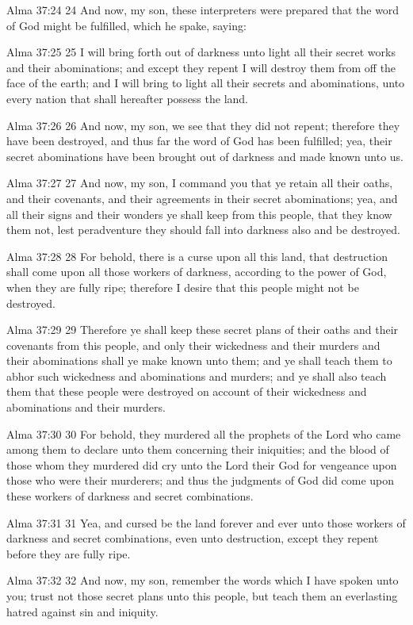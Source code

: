 Alma 37:24
 24 And now, my son, these interpreters were prepared that the
word of God might be fulfilled, which he spake, saying:

Alma 37:25
 25 I will bring forth out of darkness unto light all their
secret works and their abominations; and except they repent I
will destroy them from off the face of the earth; and I will
bring to light all their secrets and abominations, unto every
nation that shall hereafter possess the land.

Alma 37:26
 26 And now, my son, we see that they did not repent; therefore
they have been destroyed, and thus far the word of God has been
fulfilled; yea, their secret abominations have been brought out
of darkness and made known unto us.

Alma 37:27
 27 And now, my son, I command you that ye retain all their
oaths, and their covenants, and their agreements in their secret
abominations; yea, and all their signs and their wonders ye shall
keep from this people, that they know them not, lest peradventure
they should fall into darkness also and be destroyed.

Alma 37:28
 28 For behold, there is a curse upon all this land, that
destruction shall come upon all those workers of darkness,
according to the power of God, when they are fully ripe;
therefore I desire that this people might not be destroyed.

Alma 37:29
 29 Therefore ye shall keep these secret plans of their oaths and
their covenants from this people, and only their wickedness and
their murders and their abominations shall ye make known unto
them; and ye shall teach them to abhor such wickedness and
abominations and murders; and ye shall also teach them that these
people were destroyed on account of their wickedness and
abominations and their murders.

Alma 37:30
 30 For behold, they murdered all the prophets of the Lord who
came among them to declare unto them concerning their iniquities;
and the blood of those whom they murdered did cry unto the Lord
their God for vengeance upon those who were their murderers; and
thus the judgments of God did come upon these workers of darkness
and secret combinations.

Alma 37:31
 31 Yea, and cursed be the land forever and ever unto those
workers of darkness and secret combinations, even unto
destruction, except they repent before they are fully ripe.

Alma 37:32
 32 And now, my son, remember the words which I have spoken unto
you; trust not those secret plans unto this people, but teach
them an everlasting hatred against sin and iniquity.

